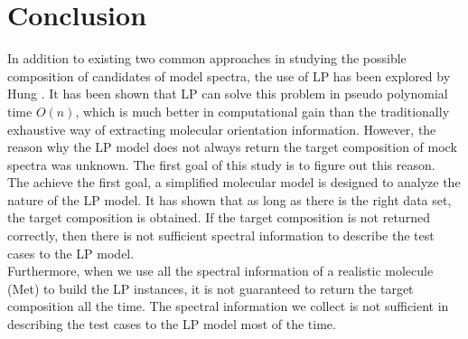   \label{ch:7}

\section{Conclusion}
In addition to existing two common approaches in studying the possible composition of candidates of model spectra, the use of LP has been explored by Hung \cite{KuoKaiHung:Thesis:2015}. It has been shown that LP can solve this problem in pseudo polynomial time $O(n)$, which is much better in computational gain than the traditionally exhaustive way of extracting molecular orientation information. However, the reason why the LP model does not always return the target composition of mock spectra was unknown. The first goal of this study is to figure out this reason. \\

The achieve the first goal, a simplified molecular model is designed to analyze the nature of the LP model. It has shown that as long as there is the right data set, the target composition is obtained. If the target composition is not returned correctly, then there is not sufficient spectral information to describe the test cases to the LP model. \\

Furthermore, when we use all the spectral information of a realistic molecule (Met) to build the LP instances, it is not guaranteed to return the target composition all the time. The spectral information we collect is not sufficient in describing the test cases to the LP model most of the time. \\



